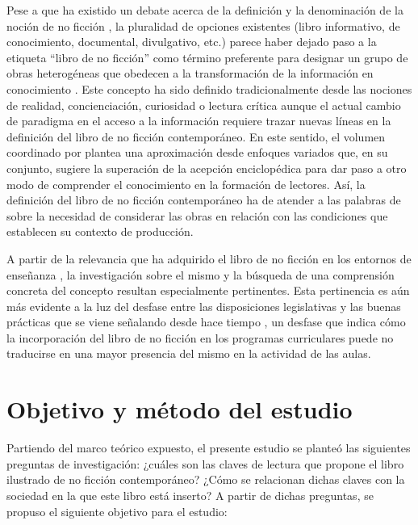 \documentclass[spanish]{textolivre}
\begin{document}
Pese a que ha existido un debate acerca de la definición y la denominación de la noción de no ficción \cite{von-merveldt_informational_2018}, la pluralidad de opciones existentes (libro informativo, de conocimiento, documental, divulgativo, etc.) parece haber dejado paso a la etiqueta “libro de no ficción” como término preferente para designar un grupo de obras heterogéneas que obedecen a la transformación de la información en conocimiento \cite{duke_3.6_2000,duke_reading_2003}. Este concepto ha sido definido tradicionalmente desde las nociones de realidad, concienciación, curiosidad o lectura crítica \cite{carter_libros_2001,gonzalez-yunis_libros_2011,garralon_leer_2013} aunque el actual cambio de paradigma en el acceso a la información requiere trazar nuevas líneas en la definición del libro de no ficción contemporáneo. En este sentido, el volumen coordinado por \textcite{grilli_non-fiction_2020a} plantea una aproximación desde enfoques variados que, en su conjunto, sugiere la superación de la acepción enciclopédica para dar paso a otro modo de comprender el conocimiento en la formación de lectores. Así, la definición del libro de no ficción contemporáneo ha de atender a las palabras de \textcite{soriano_literatura_1995} sobre la necesidad de considerar las obras en relación con las condiciones que establecen su contexto de producción.

A partir de la relevancia que ha adquirido el libro de no ficción en los entornos de enseñanza \cite{malloy_assessing_2017,vaughn_examining_2022}, la investigación sobre el mismo y la búsqueda de una comprensión concreta del concepto resultan especialmente pertinentes. Esta pertinencia es aún más evidente a la luz del desfase entre las disposiciones legislativas y las buenas prácticas que se viene señalando desde hace tiempo \cite{duke_3.6_2000}, un desfase que indica cómo la incorporación del libro de no ficción en los programas curriculares puede no traducirse en una mayor presencia del mismo en la actividad de las aulas.

\section{Objetivo y método del estudio}\label{sec-normas}
Partiendo del marco teórico expuesto, el presente estudio se planteó las siguientes preguntas de investigación: ¿cuáles son las claves de lectura que propone el libro ilustrado de no ficción contemporáneo? ¿Cómo se relacionan dichas claves con la sociedad en la que este libro está inserto? A partir de dichas preguntas, se propuso el siguiente objetivo para el estudio:
\end{document}
